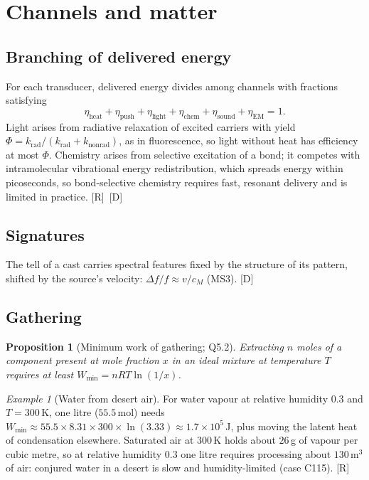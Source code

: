 \documentclass[11pt,a4paper]{article}
\numberwithin{equation}{section}
\theoremstyle{definition}
\theoremstyle{plain}
\newtheorem{proposition}[definition]{Proposition}
\theoremstyle{remark}
\newtheorem{example}[definition]{Example}
\newcommand{\cM}{c_{M}}
\newcommand{\tagD}{\textcolor{tag}{\textsf{[D]}}}
\newcommand{\tagR}{\textcolor{tag}{\textsf{[R]}}}
\begin{document}
\section{Channels and matter}\label{sec:matter}

\subsection{Branching of delivered energy}
For each transducer, delivered energy divides among channels with fractions satisfying
\begin{equation}
\eta_{\text{heat}}+\eta_{\text{push}}+\eta_{\text{light}}+\eta_{\text{chem}}+\eta_{\text{sound}}+\eta_{\text{EM}}=1 .
\end{equation}
Light arises from radiative relaxation of excited carriers with yield $\Phi=k_{\text{rad}}/(k_{\text{rad}}+k_{\text{nonrad}})$, as in fluorescence, so light without heat has efficiency at most $\Phi$. Chemistry arises from selective excitation of a bond; it competes with intramolecular vibrational energy redistribution, which spreads energy within picoseconds, so bond-selective chemistry requires fast, resonant delivery and is limited in practice. \tagR\ \tagD

\subsection{Signatures}
The tell of a cast carries spectral features fixed by the structure of its pattern, shifted by the source's velocity: $\Delta f/f\approx v/\cM$ (MS3). \tagD

\subsection{Gathering}
\begin{proposition}[Minimum work of gathering; Q5.2]
Extracting $n$ moles of a component present at mole fraction $x$ in an ideal mixture at temperature $T$ requires at least $W_{\min}=nRT\ln(1/x)$.
\end{proposition}
\begin{example}[Water from desert air]
For water vapour at relative humidity $0.3$ and $T=300$\,K, one litre ($55.5$\,mol) needs $W_{\min}\approx55.5\times8.31\times300\times\ln(3.33)\approx1.7\times10^5$\,J, plus moving the latent heat of condensation elsewhere. Saturated air at 300\,K holds about $26$\,g of vapour per cubic metre, so at relative humidity $0.3$ one litre requires processing about $130$\,m$^3$ of air: conjured water in a desert is slow and humidity-limited (case C115). \tagR
\end{example}
\end{document}
